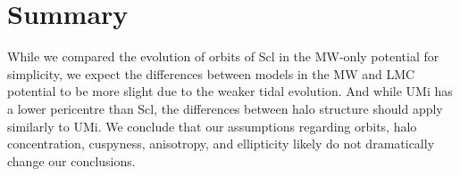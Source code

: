 \section{Summary}\label{summary}

While we compared the evolution of orbits of Scl in the MW-only
potential for simplicity, we expect the differences between models in
the MW and LMC potential to be more slight due to the weaker tidal
evolution. And while UMi has a lower pericentre than Scl, the
differences between halo structure should apply similarly to UMi. We
conclude that our assumptions regarding orbits, halo concentration,
cuspyness, anisotropy, and ellipticity likely do not dramatically change
our conclusions.
